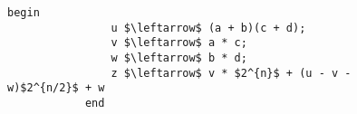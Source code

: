 \documentclass{subfiles}
\begin{document}
\begin{figure*}[!h]
    \centering
    \begin{subfigure}[b]{0.5\textwidth}
        \begin{lstlisting}[language = algol]
            begin
                u $\leftarrow$ (a + b)(c + d);
                v $\leftarrow$ a * c;
                w $\leftarrow$ b * d;
                z $\leftarrow$ v * $2^{n}$ + (u - v - w)$2^{n/2}$ + w
            end
        \end{lstlisting}
    \end{subfigure}
\end{figure*}
\end{document}
